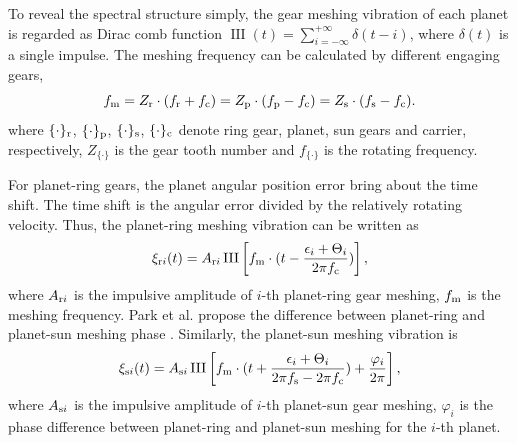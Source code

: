 \documentclass[a4paper,fleqn]{cas-sc}%
\begin{document}
\par To reveal the spectral structure simply, the gear meshing vibration of each planet is regarded as Dirac comb function $\operatorname{III}(t)=\sum_{i=-\infty}^{+\infty}\delta(t-i)$, where $\delta(t)$ is a single impulse. The meshing frequency can be calculated by different engaging gears,
\begin{equation}
    f_{\rm m}=Z_{\rm r} \cdot (f_{\rm r}+f_{\rm c})=Z_{\rm p} \cdot (f_{\rm p}-f_{\rm c})=Z_{\rm s} \cdot (f_{\rm s}-f_{\rm c}). \label{eq:meshing_frequency}
\end{equation}
where $\{\cdot\}_{\rm r}$, $\{\cdot\}_{\rm p}$, $\{\cdot\}_{\rm s}$, $\{\cdot\}_{\rm c}$ denote ring gear, planet, sun gears and carrier, respectively, $Z_{\{\cdot\}}$ is the gear tooth number and $f_{\{\cdot\}}$ is the rotating frequency. 
\par For planet-ring gears, the planet angular position error bring about the time shift. The time shift is the angular error divided by the relatively rotating velocity. Thus, the planet-ring meshing vibration can be written as
\begin{equation}
    \xi_{{\rm r}i}(t)=A_{{\rm r}i}\operatorname{III}\left[f_{\rm m} \cdot (t-\frac{\epsilon_i+\Theta_i}{2 \pi f_{\rm c}})\right],\label{eq:planet-ring_meshing}
\end{equation}
where $A_{{\rm r}i}$ is the impulsive amplitude of $i$-th planet-ring gear meshing, $f_{\rm m}$ is the meshing frequency. Park et al. propose the difference between planet-ring and planet-sun meshing phase \cite{Parker2004}. Similarly, the planet-sun meshing vibration is
\begin{equation}
    \xi_{{\rm s}i}(t)=A_{{\rm s}i} \operatorname{III}\left[f_{\rm m} \cdot (t + \frac{\epsilon_i+\Theta_i}{2 \pi f_{\rm s}- 2 \pi f_{\rm c}})+ \frac{\varphi_i}{2 \pi} \right],\label{eq:planet-sun_meshing}
\end{equation}
where $A_{{\rm s}i}$ is the impulsive amplitude of $i$-th planet-sun gear meshing, $\varphi_i$ is the phase difference between planet-ring and planet-sun meshing for the $i$-th planet.
\end{document}
